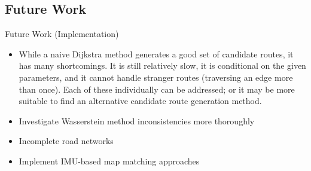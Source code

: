 \documentclass[aspectratio=169, bigfiles]{beamer}
\begin{document}
\subsection{Future Work}
\begin{frame}{Future Work (Implementation)}
    \begin{itemize}
        \item While a naive Dijkstra method generates a good set of candidate routes, it has many shortcomings. It is still relatively slow, it is conditional on the given parameters, and it cannot handle stranger routes (traversing an edge more than once). Each of these individually can be addressed; or it may be more suitable to find an alternative candidate route generation method.
        \item Investigate Wasserstein method inconsistencies more thoroughly
        \item Incomplete road networks
        \item Implement IMU-based map matching approaches
    \end{itemize}
\end{frame}




    
    
\end{document}
